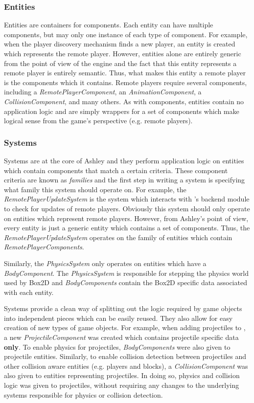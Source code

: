 \subsubsection{Entities}
Entities are containers for components. Each entity can have multiple components, but may only one instance of each type of component. For example, when the player discovery mechanism finds a new player, an entity is created which represents the remote player. However, entities alone are entirely generic from the point of view of the engine and the fact that this entity represents a remote player is entirely semantic. Thus, what makes this entity a remote player is the components which it contains. Remote players require several components, including a \textit{RemotePlayerComponent}, an \textit{AnimationComponent}, a \textit{CollisionComponent}, and many others. As with components, entities contain no application logic and are simply wrappers for a set of components which make logical sense from the game's perspective (e.g. remote players).

\subsubsection{Systems}
Systems are at the core of Ashley and they perform application logic on entities which contain components that match a certain criteria. These component criteria are known as \textit{families} and the first step in writing a system is specifying what family this system should operate on. For example, the \textit{RemotePlayerUpdateSystem} is the system which interacts with \game{}'s backend module to check for updates of remote players. Obviously this system should only operate on entities which represent remote players. However, from Ashley's point of view, every entity is just a generic entity which contains a set of components. Thus, the \textit{RemotePlayerUpdateSystem} operates on the family of entities which contain \textit{RemotePlayerComponents}. 

Similarly, the \textit{PhysicsSystem} only operates on entities which have a \textit{BodyComponent}. The \textit{PhysicsSystem} is responsible for stepping the physics world used by Box2D and \textit{BodyComponents} contain the Box2D specific data associated with each entity.

Systems provide a clean way of splitting out the logic required by game objects into independent pieces which can be easily reused. They also allow for easy creation of new types of game objects. For example, when adding projectiles to \game{}, a new \textit{ProjectileComponent} was created which contains projectile specific data \textbf{only}. To enable physics for projectiles, \textit{BodyComponents} were also given to projectile entities. Similarly, to enable collision detection between projectiles and other collision aware entities (e.g. players and blocks), a \textit{CollisionComponent} was also given to entities representing projectiles. In doing so, physics and collision logic was given to projectiles, without requiring any changes to the underlying systems responsible for physics or collision detection.

